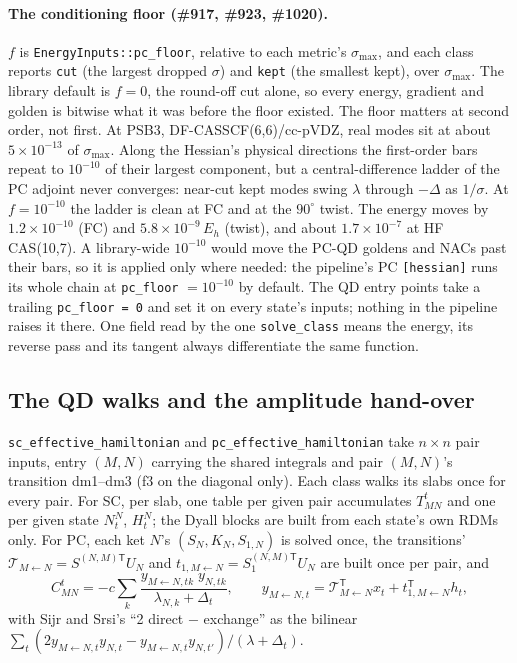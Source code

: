 \documentclass[11pt]{article}
\newcommand{\code}[1]{\texttt{#1}}
\newcommand{\T}{\mathsf T}
\newcommand{\Tc}{\mathcal T}
\begin{document}
\paragraph{The conditioning floor (\#917, \#923, \#1020).} $f$ is
\code{EnergyInputs::pc\_floor}, relative to each metric's $\sigma_{\max}$,
and each class reports \code{cut} (the largest dropped $\sigma$) and
\code{kept} (the smallest kept), over $\sigma_{\max}$. The library default is
$f = 0$, the round-off cut alone, so every energy, gradient and golden is
bitwise what it was before the floor existed. The floor matters at second
order, not first. At PSB3, DF-CASSCF(6,6)/cc-pVDZ, real modes sit at about
$5\times10^{-13}$ of $\sigma_{\max}$. Along the Hessian's physical directions
the first-order bars repeat to $10^{-10}$ of their largest component, but a
central-difference ladder of the PC adjoint never converges: near-cut kept
modes swing $\lambda$ through $-\Delta$ as $1/\sigma$. At $f = 10^{-10}$ the
ladder is clean at FC and at the $90^\circ$ twist. The energy moves by
$1.2\times10^{-10}$ (FC) and $5.8\times10^{-9}\,E_h$ (twist), and about
$1.7\times10^{-7}$ at HF CAS(10,7). A library-wide $10^{-10}$ would move the PC-QD
goldens and NACs past their bars, so it is applied only where needed: the
pipeline's PC \code{[hessian]} runs its whole chain at \code{pc\_floor}
$= 10^{-10}$ by default. The QD entry points take a trailing
\code{pc\_floor = 0} and set it on every state's inputs; nothing in the
pipeline raises it there. One field read by the one \code{solve\_class}
means the energy, its reverse pass and its tangent always differentiate the
same function.

\subsection{The QD walks and the amplitude hand-over}
\label{sec:qd-walk}

\code{sc\_effective\_hamiltonian} and \code{pc\_effective\_hamiltonian} take
$n\times n$ pair inputs, entry $(M,N)$ carrying the shared integrals and
pair $(M,N)$'s transition dm1--dm3 (f3 on the diagonal only). Each class
walks its slabs once for every pair. For SC, per slab, one table per given
pair accumulates $T^t_{MN}$ and one per given state $N^N_t$, $H^N_t$; the
Dyall blocks are built from each state's own RDMs only. For PC, each ket
$N$'s $(S_N, K_N, S_{1,N})$ is solved once, the transitions' $\Tc_{M\leftarrow N}
= S^{(N,M)\T}U_N$ and $t_{1,M\leftarrow N} = S_1^{(N,M)\T}U_N$ are built once
per pair, and
\begin{equation}
  C^t_{MN} = -c\sum_k \frac{y_{M\leftarrow N,tk}\;y_{N,tk}}{\lambda_{N,k} + \Delta_t},\qquad
  y_{M\leftarrow N,t} = \Tc_{M\leftarrow N}^\T x_t + t_{1,M\leftarrow N}^\T h_t,
\end{equation}
with Sijr and Srsi's ``2 direct $-$ exchange'' as the bilinear
$\sum_t(2y_{M\leftarrow N,t}y_{N,t} - y_{M\leftarrow N,t}y_{N,t'})/(\lambda+\Delta_t)$.
\end{document}
